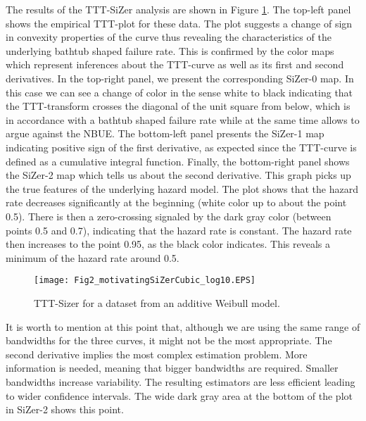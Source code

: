 \documentclass[preprint,12pt]{elsarticle}
\begin{document}
The results of the TTT-SiZer analysis are shown in Figure \ref{Fig:simulatedSizer}. The top-left panel shows the empirical TTT-plot for these data. The plot suggests a change of sign in convexity properties of the curve thus revealing the characteristics of the underlying  bathtub shaped failure rate. This is confirmed by the color maps which represent inferences about the TTT-curve as well as its first and second derivatives. In the top-right panel, we present the corresponding SiZer-0 map. In this case we can see a change of color in the sense white to black indicating that the TTT-transform crosses the diagonal of the unit square from below, which is in accordance with a bathtub shaped failure rate while at the same time allows to argue against the NBUE. The bottom-left panel presents the SiZer-1 map indicating positive sign of the first derivative, as expected since the TTT-curve is defined as a cumulative integral function. Finally, the bottom-right panel shows the SiZer-2 map which tells us about the second derivative. This graph picks up the true features of the underlying hazard model. 
The plot shows that the hazard rate decreases significantly at the beginning (white color up to about the point 0.5). There is then a zero-crossing  signaled by the dark gray color  (between points 0.5 and 0.7), indicating that the hazard rate is constant. The hazard rate then increases to the point 0.95, as the black color indicates. This reveals a minimum of the hazard rate around 0.5.
  

\begin{figure}[htb]
\begin{center}
\texttt{[image: Fig2\_motivatingSiZerCubic\_log10.EPS]}
\caption{TTT-Sizer for a dataset from an additive Weibull model.}\label{Fig:simulatedSizer}
\end{center}
\end{figure}

It is worth to mention at this point that, although we are using the same range of bandwidths for the three curves, it might not be the most appropriate. The second derivative implies the most complex estimation problem. More information is needed, meaning that bigger bandwidths are required. Smaller bandwidths increase variability. The resulting estimators are less efficient leading to wider confidence intervals. The wide dark gray area at the bottom of the plot in SiZer-2 shows this point.


\end{document}

